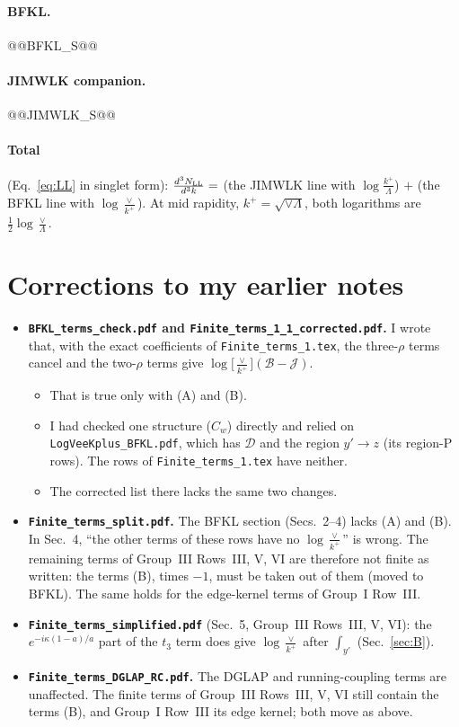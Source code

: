 \documentclass[10pt]{article}
\numberwithin{equation}{section}
\newcommand{\BB}{\mathcal B}
\newcommand{\JJ}{\mathcal J}
\newcommand{\Lv}{\log\Big[\frac{\vee}{k^+}\Big]}
\begin{document}
\paragraph{BFKL.}
@@BFKL_S@@
\paragraph{JIMWLK companion.}
@@JIMWLK_S@@
\paragraph{Total} (Eq.~\eqref{eq:LL} in singlet form): $\frac{d^3N_{\rm LL}}{d^3k}=$ (the JIMWLK line with $\log\frac{k^+}{\Lambda}$) $+$ (the BFKL line with $\log\frac{\vee}{k^+}$). At mid rapidity, $k^+=\sqrt{\vee\Lambda}$, both logarithms are $\frac12\log\frac{\vee}{\Lambda}$.

\section{Corrections to my earlier notes}\label{sec:corr}
\begin{itemize}
\item \textbf{\texttt{BFKL\_terms\_check.pdf} and \texttt{Finite\_terms\_1\_1\_corrected.pdf}.} I wrote that, with the exact coefficients of \texttt{Finite\_terms\_1.tex}, the three-$\rho$ terms cancel and the two-$\rho$ terms give $\Lv(\BB-\JJ)$.
\begin{itemize}
\item That is true only with (A) and (B).
\item I had checked one structure ($C_w$) directly and relied on \texttt{LogVeeKplus\_BFKL.pdf}, which has $\mathcal D$ and the region $y'\to z$ (its region-P rows). The rows of \texttt{Finite\_terms\_1.tex} have neither.
\item The corrected list there lacks the same two changes.
\end{itemize}
\item \textbf{\texttt{Finite\_terms\_split.pdf}.} The BFKL section (Secs.~2--4) lacks (A) and (B). In Sec.~4, ``the other terms of these rows have no $\log\frac{\vee}{k^+}$'' is wrong. The remaining terms of Group~III Rows~III, V, VI are therefore not finite as written: the terms (B), times $-1$, must be taken out of them (moved to BFKL). The same holds for the edge-kernel terms of Group~I Row~III.
\item \textbf{\texttt{Finite\_terms\_simplified.pdf}} (Sec.~5, Group~III Rows~III, V, VI): the $e^{-i\kappa(1-a)/a}$ part of the $t_3$ term does give $\log\frac{\vee}{k^+}$ after $\int_{y'}$ (Sec.~\ref{sec:B}).
\item \textbf{\texttt{Finite\_terms\_DGLAP\_RC.pdf}.} The DGLAP and running-coupling terms are unaffected. The finite terms of Group~III Rows~III, V, VI still contain the terms (B), and Group~I Row~III its edge kernel; both move as above.
\end{itemize}
\end{document}
